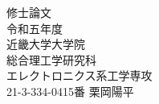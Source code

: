 \begin{titlepage}
\begin{center}
\LARGE
\vspace*{1cm}

\Huge{修\hspace{2zw}士\hspace{2zw}論\hspace{2zw}文}\\
\vspace{1cm}
\huge{令和五年度}\\

\vspace*{9cm}
\vspace*{2cm}
\huge{近畿大学大学院\\
総合理工学研究科\\
エレクトロニクス系工学専攻\\
21-3-334-0415番 \hspace{0.5zw} 栗\hspace{0.5zw}岡\hspace{0.5zw}陽\hspace{0.5zw}平
}
\end{center}
\end{titlepage}
 

